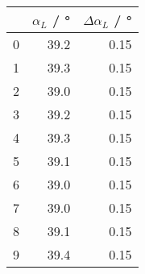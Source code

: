 \begin{tabular}{lrr}
\toprule
{} &  $\alpha_{L}$ / \si{\degree} &  $\Delta \alpha_{L}$ / \si{\degree} \\
\midrule
0 &                         39.2 &                                0.15 \\
1 &                         39.3 &                                0.15 \\
2 &                         39.0 &                                0.15 \\
3 &                         39.2 &                                0.15 \\
4 &                         39.3 &                                0.15 \\
5 &                         39.1 &                                0.15 \\
6 &                         39.0 &                                0.15 \\
7 &                         39.0 &                                0.15 \\
8 &                         39.1 &                                0.15 \\
9 &                         39.4 &                                0.15 \\
\bottomrule
\end{tabular}
